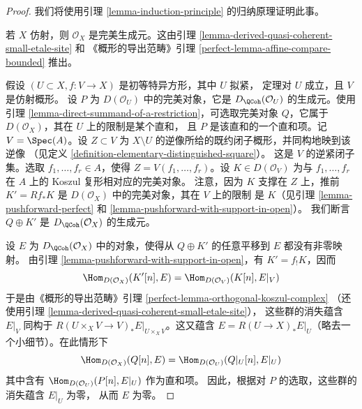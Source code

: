 \begin{proof}
我们将使用引理 \ref{lemma-induction-principle} 的归纳原理证明此事。

\medskip\noindent
若 $X$ 仿射，则 $\mathcal{O}_X$ 是完美生成元。这由引理
\ref{lemma-derived-quasi-coherent-small-etale-site} 和
《概形的导出范畴》引理
\ref{perfect-lemma-affine-compare-bounded} 推出。

\medskip\noindent
假设 $(U \subset X, f : V \to X)$ 是初等特异方形，其中 $U$ 拟紧，
定理对 $U$ 成立，且 $V$ 是仿射概形。
设 $P$ 为 $D(\mathcal{O}_U)$ 中的完美对象，它是
$D_\QCoh(\mathcal{O}_U)$ 的生成元。使用引理
\ref{lemma-direct-summand-of-a-restriction}，可选取完美对象
$Q$，它属于 $D(\mathcal{O}_X)$，其在 $U$ 上的限制是某个直和，
且 $P$ 是该直和的一个直和项。记 $V = \Spec(A)$。设 $Z \subset V$
为 $X \setminus U$ 的逆像所给的既约闭子概形，并同构地映到该逆像
（见定义 \ref{definition-elementary-distinguished-square}）。
这是 $V$ 的逆紧闭子集。选取 $f_1, \ldots, f_r \in A$，使得
$Z = V(f_1, \ldots, f_r)$。设 $K \in D(\mathcal{O}_V)$ 为与
$f_1, \ldots, f_r$ 在 $A$ 上的 Koszul 复形相对应的完美对象。
注意，因为 $K$ 支撑在 $Z$ 上，推前
$K' = Rf_*K$ 是 $D(\mathcal{O}_X)$ 中的完美对象，其在 $V$ 上的限制
是 $K$（见引理 \ref{lemma-pushforward-perfect} 和
\ref{lemma-pushforward-with-support-in-open}）。
我们断言 $Q \oplus K'$ 是 $D_\QCoh(\mathcal{O}_X)$ 的生成元。

\medskip\noindent
设 $E$ 为 $D_\QCoh(\mathcal{O}_X)$ 中的对象，使得从
$Q \oplus K'$ 的任意平移到 $E$ 都没有非零映射。
由引理 \ref{lemma-pushforward-with-support-in-open}，有
$K' =  f_! K$，因而
$$
\Hom_{D(\mathcal{O}_X)}(K'[n], E) = \Hom_{D(\mathcal{O}_V)}(K[n], E|_V)
$$
于是由《概形的导出范畴》引理
\ref{perfect-lemma-orthogonal-koszul-complex}
（还使用引理 \ref{lemma-derived-quasi-coherent-small-etale-site}），
这些群的消失蕴含 $E|_V$ 同构于
$R(U \times_X V \to V)_*E|_{U \times_X V}$。这又蕴含
$E = R(U \to X)_*E|_U$（略去一个小细节）。在此情形下
$$
\Hom_{D(\mathcal{O}_X)}(Q[n], E) = \Hom_{D(\mathcal{O}_U)}(Q|_U[n], E|_U)
$$
其中含有 $\Hom_{D(\mathcal{O}_U)}(P[n], E|_U)$ 作为直和项。
因此，根据对 $P$ 的选取，这些群的消失蕴含 $E|_U$ 为零，
从而 $E$ 为零。
\end{proof}












